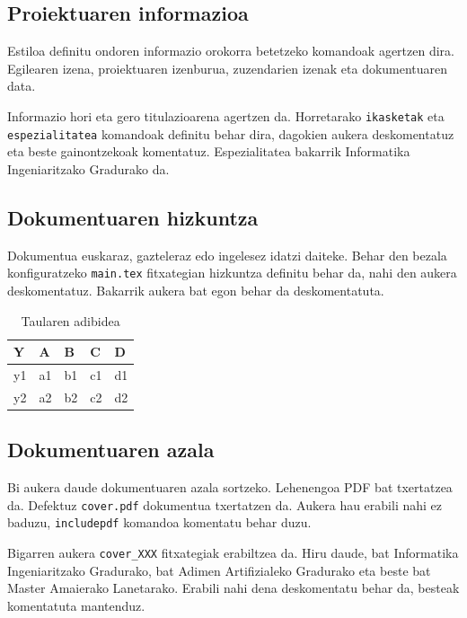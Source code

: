 \subsection{Proiektuaren informazioa}

Estiloa definitu ondoren informazio orokorra betetzeko komandoak agertzen dira. Egilearen izena, proiektuaren izenburua, zuzendarien izenak eta dokumentuaren data.

Informazio hori eta gero titulazioarena agertzen da. Horretarako \texttt{ikasketak} eta \texttt{espezialitatea} komandoak definitu behar dira, dagokien aukera deskomentatuz eta beste gainontzekoak komentatuz. Espezialitatea bakarrik Informatika Ingeniaritzako Gradurako da.

\subsection{Dokumentuaren hizkuntza}

Dokumentua euskaraz, gazteleraz edo ingelesez idatzi daiteke. Behar den bezala konfiguratzeko \texttt{main.tex} fitxategian hizkuntza definitu behar da, nahi den aukera deskomentatuz. Bakarrik aukera bat egon behar da deskomentatuta.

\begin{table}[t]
	\centering
	\begin{tabular}{l|llll}
		Y & A & B & C & D\\
		\hline
		y1 & a1 & b1 & c1 & d1\\
		y2 & a2 & b2 & c2 & d2\\
	\end{tabular}
	\caption {Taularen adibidea}\label{tab:adibidea}
\end{table}

\subsection{Dokumentuaren azala}

Bi aukera daude dokumentuaren azala sortzeko. Lehenengoa PDF bat txertatzea da. Defektuz \texttt{cover.pdf} dokumentua txertatzen da. Aukera hau erabili nahi ez baduzu, \texttt{includepdf} komandoa komentatu behar duzu. 

Bigarren aukera \texttt{cover\_XXX} fitxategiak erabiltzea da. Hiru daude, bat Informatika Ingeniaritzako Gradurako, bat Adimen Artifizialeko Gradurako eta beste bat Master Amaierako Lanetarako. Erabili nahi dena deskomentatu behar da, besteak komentatuta mantenduz.

